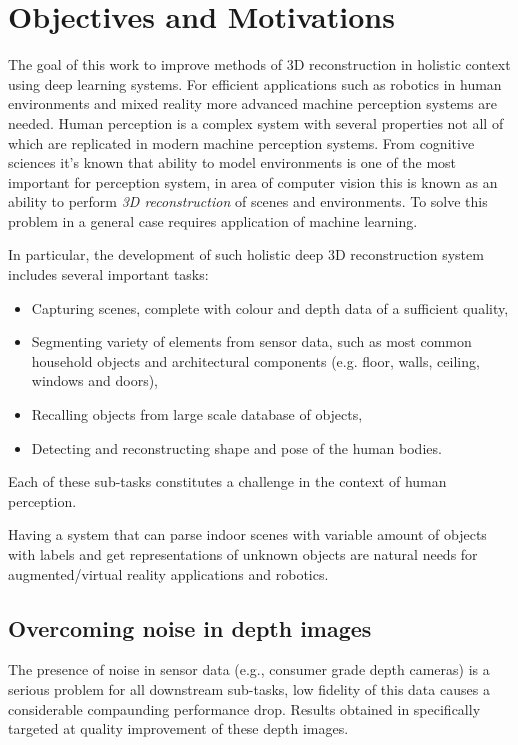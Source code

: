 \section{Objectives and Motivations}

The goal of this work to improve methods of 3D reconstruction in holistic context using deep learning systems. For efficient applications such as robotics in human environments and mixed reality more advanced machine perception systems are needed. Human perception is a complex system with several properties not all of which are replicated in modern machine perception systems. From cognitive sciences it's known that ability to model environments is one of the most important for perception system, in area of computer vision this is known as an ability to perform \textit{3D reconstruction} of scenes and environments. To solve this problem in a general case requires application of machine learning.

In particular, the development of such holistic deep 3D reconstruction system includes several important tasks:

\begin{itemize}
    \item Capturing scenes, complete with colour and depth data of a sufficient quality,
    \item Segmenting variety of elements from sensor data, such as most common household objects and architectural components (e.g. floor, walls, ceiling, windows and doors),
    \item Recalling objects from large scale database of objects,
    \item Detecting and reconstructing shape and pose of the human bodies.
\end{itemize}

Each of these sub-tasks constitutes a challenge in the context of human perception.

Having a system that can parse indoor scenes with variable amount of objects with labels and get representations of unknown objects are natural needs for augmented/virtual reality applications and robotics.

\subsection{Overcoming noise in depth images}
The presence of noise in sensor data (e.g., consumer grade depth cameras) is a serious problem for all downstream sub-tasks, low fidelity of this data causes a considerable compaunding performance drop. Results obtained in  specifically targeted at quality improvement of these depth images.

